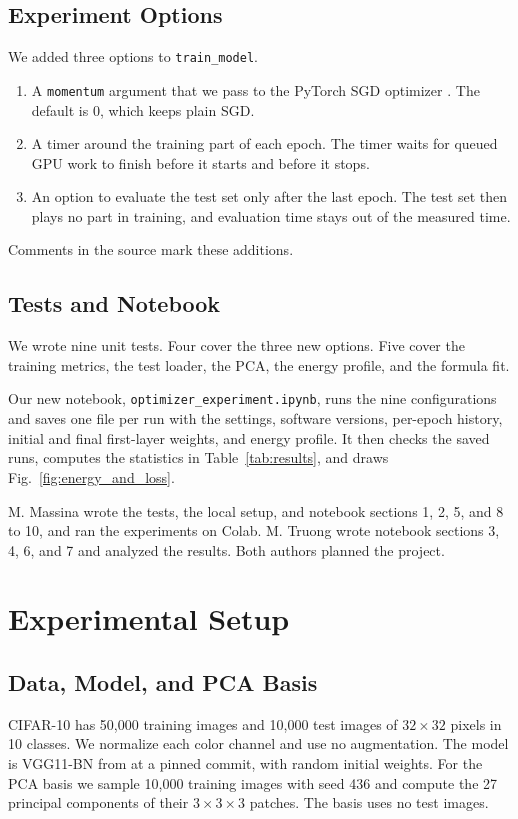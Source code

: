 \documentclass[conference]{IEEEtran}
\begin{document}
\subsection{Experiment Options}
We added three options to \texttt{train\_model}.
\begin{enumerate}
\item A \texttt{momentum} argument that we pass to the PyTorch SGD optimizer
\cite{paszke2019}. The default is 0, which keeps plain SGD.
\item A timer around the training part of each epoch. The timer waits for
queued GPU work to finish before it starts and before it stops.
\item An option to evaluate the test set only after the last epoch. The test
set then plays no part in training, and evaluation time stays out of the
measured time.
\end{enumerate}
Comments in the source mark these additions.

\subsection{Tests and Notebook}
We wrote nine unit tests. Four cover the three new options. Five cover the
training metrics, the test loader, the PCA, the energy profile, and the
formula fit.

Our new notebook, \texttt{optimizer\_experiment.ipynb}, runs the nine
configurations and saves one file per run with the settings, software
versions, per-epoch history, initial and final first-layer weights, and energy
profile. It then checks the saved runs, computes the statistics in
Table~\ref{tab:results}, and draws Fig.~\ref{fig:energy_and_loss}.

M. Massina wrote the tests, the local setup, and notebook sections 1, 2, 5,
and 8 to 10, and ran the experiments on Colab. M. Truong wrote notebook
sections 3, 4, 6, and 7 and analyzed the results. Both authors planned the
project.

\section{Experimental Setup}
\subsection{Data, Model, and PCA Basis}
CIFAR-10 \cite{krizhevsky2009} has 50,000 training images and 10,000 test
images of $32\times32$ pixels in 10 classes. We normalize each color channel
and use no augmentation. The model is VGG11-BN from \cite{chen2021} at a
pinned commit, with random initial weights. For the PCA basis we sample 10,000
training images with seed 436 and compute the 27 principal components of their
$3\times3\times3$ patches. The basis uses no test images.
\end{document}
